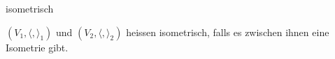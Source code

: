 \documentclass[class=article, crop=false]{standalone}
\begin{document}
\begin{zettel}{isometrisch}
\begin{flashcard}
\begin{definition}[isometrisch]
    $(V_1, \langle ,\rangle _1)$ und $(V_2, \langle ,\rangle _2)$ heissen isometrisch, falls es zwischen ihnen eine Isometrie gibt.
\end{definition}
\end{flashcard}
\end{zettel}
\end{document}

